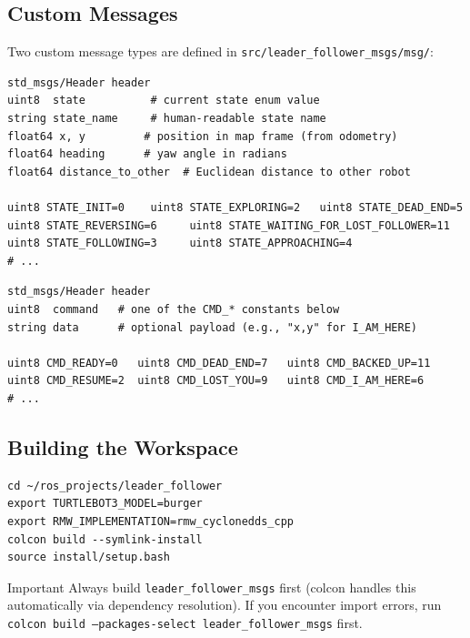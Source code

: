 \documentclass[11pt, a4paper]{article}
\begin{document}
\subsection{Custom Messages}

Two custom message types are defined in \texttt{src/leader\_follower\_msgs/msg/}:

\begin{lstlisting}[style=pycode, caption={RobotStatus.msg — broadcast by each robot at 10\,Hz.}]
std_msgs/Header header
uint8  state          # current state enum value
string state_name     # human-readable state name
float64 x, y         # position in map frame (from odometry)
float64 heading      # yaw angle in radians
float64 distance_to_other  # Euclidean distance to other robot

uint8 STATE_INIT=0    uint8 STATE_EXPLORING=2   uint8 STATE_DEAD_END=5
uint8 STATE_REVERSING=6     uint8 STATE_WAITING_FOR_LOST_FOLLOWER=11
uint8 STATE_FOLLOWING=3     uint8 STATE_APPROACHING=4
# ...
\end{lstlisting}

\begin{lstlisting}[style=pycode, caption={CoordinationCommand.msg — sent on state transitions.}]
std_msgs/Header header
uint8  command   # one of the CMD_* constants below
string data      # optional payload (e.g., "x,y" for I_AM_HERE)

uint8 CMD_READY=0   uint8 CMD_DEAD_END=7   uint8 CMD_BACKED_UP=11
uint8 CMD_RESUME=2  uint8 CMD_LOST_YOU=9   uint8 CMD_I_AM_HERE=6
# ...
\end{lstlisting}

\subsection{Building the Workspace}

\begin{lstlisting}[style=shellcode]
cd ~/ros_projects/leader_follower
export TURTLEBOT3_MODEL=burger
export RMW_IMPLEMENTATION=rmw_cyclonedds_cpp
colcon build --symlink-install
source install/setup.bash
\end{lstlisting}

\begin{warnbox}{Important}
Always build \texttt{leader\_follower\_msgs} first (colcon handles this automatically
via dependency resolution). If you encounter import errors, run
\texttt{colcon build --packages-select leader\_follower\_msgs} first.
\end{warnbox}
\end{document}
